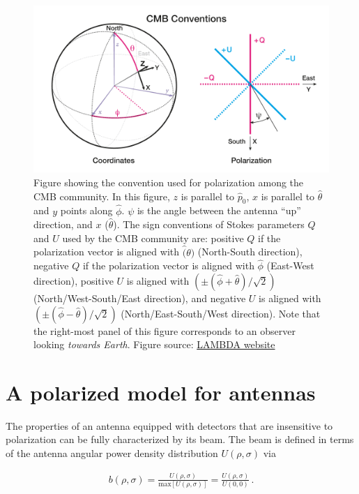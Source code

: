 \documentclass[a4paper,11pt]{article}
\begin{document}
\begin{figure}
	\centering
	\includegraphics[width=0.7\linewidth]{figures/cmb_coord_convention}
	\caption{Figure showing the convention used for polarization among the CMB community. In this figure, $z$ is parallel to $\hat{p}_0$, $x$ is parallel to $\hat{\theta}$ and $y$ points along $\hat{\phi}$. $\psi$ is the angle between the antenna ``up'' direction, and $x$ ($\hat{\theta}$). The sign conventions of Stokes parameters $Q$ and $U$ used by the CMB community are: positive $Q$ if the polarization vector is aligned with $\hat(\theta)$ (North-South direction), negative $Q$ if the polarization vector is aligned with $\hat{\phi}$ (East-West direction), positive $U$ is aligned with $(\pm(\hat{\phi} + \hat{\theta})/\sqrt{2} )$ (North/West-South/East direction), and negative $U$ is aligned with $(\pm(\hat{\phi} - \hat{\theta})/\sqrt{2} )$ (North/East-South/West direction). Note that the right-most panel of this figure corresponds to an observer looking \textsl{towards Earth}. Figure source: \href{https://lambda.gsfc.nasa.gov/product/about/pol_convention.cfm}{LAMBDA website}}
	\label{fig::cmbcoordconvention}
\end{figure}

\section{A polarized model for antennas}
\label{sec::antennas}

The properties of an antenna equipped with detectors that are insensitive to polarization can be fully characterized by its beam. The beam is defined in terms of the antenna angular power density distribution $U(\rho,\sigma)$ via

\begin{equation}
\begin{aligned}
\mathit{b}(\rho, \sigma) = \frac{ U(\rho, \sigma) }{ \mathrm{max}\left[ U(\rho,\sigma) \right] }  =  \frac{ U(\rho, \sigma) }{ U(0,0) } \, .
\end{aligned}
\label{eq::beam_def}
\end{equation}
\end{document}
